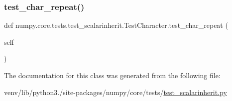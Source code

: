 \mbox{\label{classnumpy_1_1core_1_1tests_1_1test__scalarinherit_1_1TestCharacter_ae192509f429d9a387b0bcacb56de7f4f}} 
\subsubsection{\texorpdfstring{test\+\_\+char\+\_\+repeat()}{test\_char\_repeat()}}
{\footnotesize\ttfamily def numpy.\+core.\+tests.\+test\+\_\+scalarinherit.\+Test\+Character.\+test\+\_\+char\+\_\+repeat (\begin{DoxyParamCaption}\item[{}]{self }\end{DoxyParamCaption})}



The documentation for this class was generated from the following file\+:\begin{DoxyCompactItemize}
\item 
venv/lib/python3./site-\/packages/numpy/core/tests/\hyperlink{test__scalarinherit_8py}{test\+\_\+scalarinherit.\+py}\end{DoxyCompactItemize}
